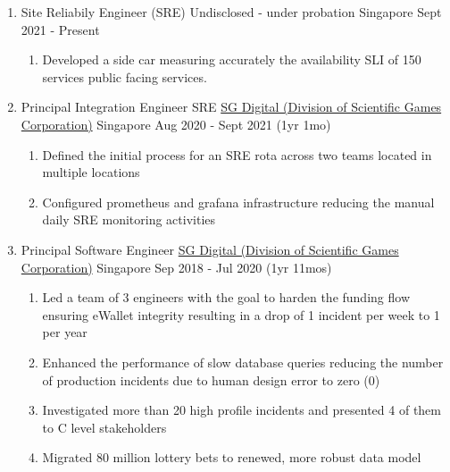 \documentclass{CVSoftwareEngineer}
\begin{document}
	\begin{enumerate}[labelwidth=!, labelindent=0pt, leftmargin=*, rightmargin=15pt]
		\item[] \cvExperience
		{Site Reliabily Engineer (SRE)}
		{Undisclosed - under probation}
		{Singapore}
		{Sept 2021 - Present}
		{\begin{enumerate}[labelwidth=!, labelindent=0pt, nosep, leftmargin=*]
				\item[\textasteriskcentered] Developed a side car measuring accurately the availability SLI of 150 services public facing services.
			\end{enumerate}
		}

		\item[] \cvExperience
			{Principal Integration Engineer \textbar SRE}
			{\href{https://www.sgdigital.com/}{SG Digital (Division of Scientific Games Corporation)}}
			{Singapore}
			{Aug 2020 - Sept 2021 (1yr 1mo)}
			{\begin{enumerate}[labelwidth=!, labelindent=0pt, nosep, leftmargin=*]
					\item[\textasteriskcentered] Defined the initial process for an SRE rota across two teams located in multiple locations
					\item[\textasteriskcentered] Configured prometheus and grafana infrastructure reducing the manual daily SRE monitoring activities
				\end{enumerate}
			}

		\item[] \cvExperience
			{Principal Software Engineer}
			{\href{https://www.sgdigital.com/}{SG Digital (Division of Scientific Games Corporation)}}
			{Singapore}
			{Sep 2018 - Jul 2020 (1yr 11mos)}
			{\begin{enumerate}[labelwidth=!, labelindent=0pt, nosep, leftmargin=*]
					\item[\textasteriskcentered] Led a team of 3 engineers with the goal to harden the
						funding flow ensuring eWallet integrity resulting in a drop of 1 incident per week
						to 1 per year
					\item[\textasteriskcentered] Enhanced the performance of slow database queries reducing
						the number of production incidents due to human design error to zero (0)
					\item[\textasteriskcentered] Investigated more than 20 high profile incidents and
						presented 4 of them to C level stakeholders
					\item[\textasteriskcentered] Migrated 80 million lottery bets to renewed,
						more robust data model
				\end{enumerate}
			}


\end{enumerate}
\end{document}
